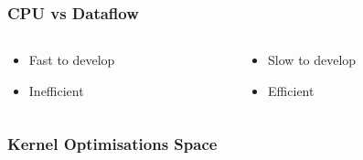 \begin{frame}
  \frametitle{CPU vs Dataflow}
  \begin{columns}
    \begin{column}{.5\linewidth}
    \vspace{-1cm}
      \begin{figure}[!ht]
        \centering
        \def\svgwidth{\linewidth}
        
      \end{figure}
      \vspace{-0.5cm}
      \begin{itemize}
      \item Fast to develop
      \item Inefficient
      \end{itemize}
    \end{column}
    \begin{column}{.5\linewidth}
    \vspace{-1cm}
      \begin{figure}[!ht]
        \centering
        \def\svgwidth{\linewidth}
        
      \end{figure}
      \vspace{-0.5cm}
      \begin{itemize}
      \item Slow to develop
      \item Efficient
      \end{itemize}
    \end{column}
  \end{columns}
\end{frame}

\begin{frame}[fragile]
  \frametitle{Kernel Optimisations Space}
  \begin{figure}[!ht]
    \centering
    \def\svgwidth{\linewidth}
    
  \end{figure}
\end{frame}


